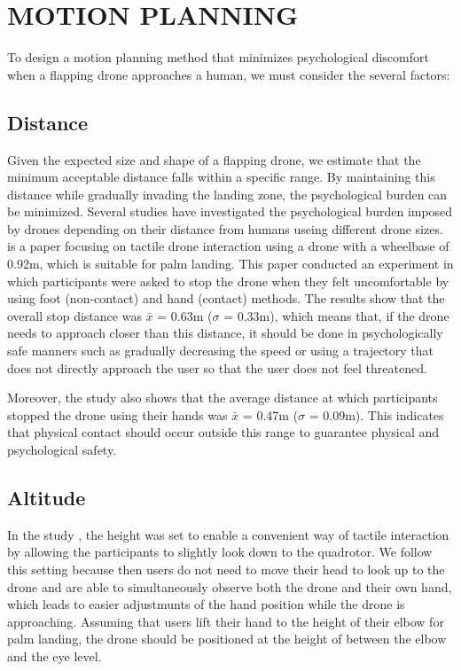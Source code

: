\section{MOTION PLANNING}
\label{sec:motion-planning}

To design a motion planning method that minimizes psychological discomfort when a flapping drone approaches a human, we must consider the several factors:

\subsection{Distance}
\label{sec:distance}
Given the expected size and shape of a flapping drone, we estimate that the minimum acceptable distance falls within a specific range. By maintaining this distance while gradually invading the landing zone, the psychological burden can be minimized.
Several studies have investigated the psychological burden imposed by drones depending on their distance from humans useing different drone sizes\cite{Yeh2017Proxemics, lieser2021evaluating-distances,Duncan2013comfortable-approach, Acharya2017robot-vs-drone-comfort}.
\cite{lieser2021evaluating-distances} is a paper focusing on tactile drone interaction using a drone with a wheelbase of 0.92m, which is suitable for palm landing.
This paper conducted an experiment in which participants were asked to stop the drone when they felt uncomfortable by using foot (non-contact) and hand (contact) methods.
The results show that the overall stop distance was $\bar{x}$ = 0.63m ($\sigma$ = 0.33m),
which means that, if the drone needs to approach closer than this distance, it should be done in psychologically safe manners such as gradually decreasing the speed or using a trajectory that does not directly approach the user so that the user does not feel threatened.

Moreover, the study \cite{lieser2021evaluating-distances} also shows that the average distance at which participants stopped the drone using their hands was $\bar{x}$ = 0.47m ($\sigma$ = 0.09m).
This indicates that physical contact should occur outside this range to guarantee physical and psychological safety.

\subsection{Altitude}

In the study \cite{lieser2021evaluating-distances}, the height was set to enable a convenient way of tactile interaction 
by allowing the participants to slightly look down to the quadrotor.
We follow this setting because then users do not need to move their head to look up to the drone and are able to simultaneously observe both the drone and their own hand, 
which leads to easier adjustmunts of the hand position while the drone is approaching.
Assuming that users lift their hand to the height of their elbow for palm landing, the drone should be positioned at the height of between the elbow and the eye level.

